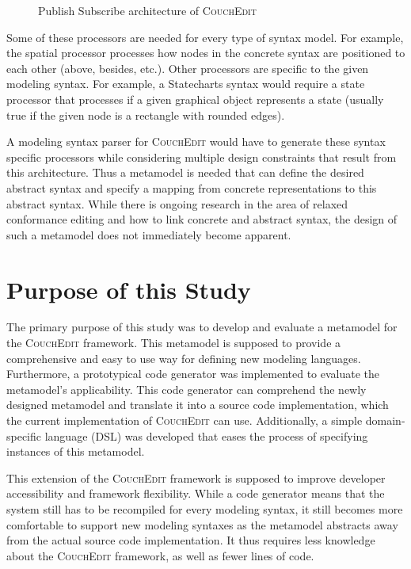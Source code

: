 \begin{figure}
  \centering
  
  \caption{Publish Subscribe architecture of \textsc{CouchEdit}}
  \label{fig:processors}
\end{figure}

Some of these processors are needed for every type of syntax model. For example, the spatial processor processes how nodes in the concrete syntax are positioned to each other (above, besides, etc.). Other processors are specific to the given modeling syntax. For example, a Statecharts syntax would require a state processor that processes if a given graphical object represents a state (usually true if the given node is a rectangle with rounded edges).

A modeling syntax parser for \textsc{CouchEdit} would have to generate these syntax specific processors while considering multiple design constraints that result from this architecture. Thus a metamodel is needed that can define the desired abstract syntax and specify a mapping from concrete representations to this abstract syntax. While there is ongoing research in the area of relaxed conformance editing and how to link concrete and abstract syntax, the design of such a metamodel does not immediately become apparent.

\section{Purpose of this Study}
The primary purpose of this study was to develop and evaluate a metamodel for the \textsc{CouchEdit} framework. This metamodel is supposed to provide a comprehensive and easy to use way for defining new modeling languages. Furthermore, a prototypical code generator was implemented to evaluate the metamodel's applicability. This code generator can comprehend the newly designed metamodel and translate it into a source code implementation, which the current implementation of \textsc{CouchEdit} can use. Additionally, a simple domain-specific language (DSL) was developed that eases the process of specifying instances of this metamodel.

This extension of the \textsc{CouchEdit} framework is supposed to improve developer accessibility and framework flexibility. While a code generator means that the system still has to be recompiled for every modeling syntax, it still becomes more comfortable to support new modeling syntaxes as the metamodel abstracts away from the actual source code implementation. It thus requires less knowledge about the \textsc{CouchEdit} framework, as well as fewer lines of code.



